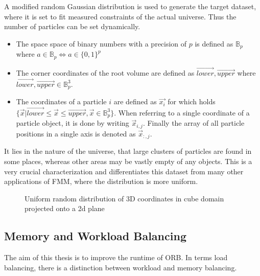 \documentclass[]{article}
\begin{document}
A modified random Gaussian distribution is used to generate the target dataset, where it is set to fit measured constraints of the actual universe. Thus the number of particles can be set dynamically. 

\begin{itemize}
	\item The space space of binary numbers with a precision of $p$ is defined as $\mathbb{B}_p$ where $a \in \mathbb{B}_p \Leftrightarrow a \in \{0,1\}^{p}$
	\item The corner coordinates of the root volume are defined as $\vec{lower}, \vec{upper}$ where $\vec{lower}, \vec{upper} \in \mathbb{B}_p^3$. 
	\item The coordinates of a particle $i$ are defined as $\vec{x_i}$ for which holds $\{\vec{x} | \vec{lower} \leq \vec{x} \leq \vec{upper}, \vec{x} \in \mathbb{B}_p^3 \}$.
	When referring to a single coordinate of a particle object, it is done by writing $\vec{x}_{i,j}$. Finally the array of all particle positions in a single axis is denoted as $\vec{x}_{:,j}$. 
	
\end{itemize}

It lies in the nature of the universe, that large clusters of particles are found in some places, whereas other areas may be vastly empty of any objects. This is a very crucial characterization and differentiates this dataset from many other applications of FMM, where the distribution is more uniform.

\begin{figure}[H]
	\begin{center}
	\end{center}
	\caption{Uniform random distribution of 3D coordinates in cube domain projected onto a 2d plane}
\end{figure}


\subsection{Memory and Workload Balancing}\label{balancing}
The aim of this thesis is to improve the runtime of ORB. In terms load balancing, there is a distinction between workload and memory balancing. 
\end{document}
